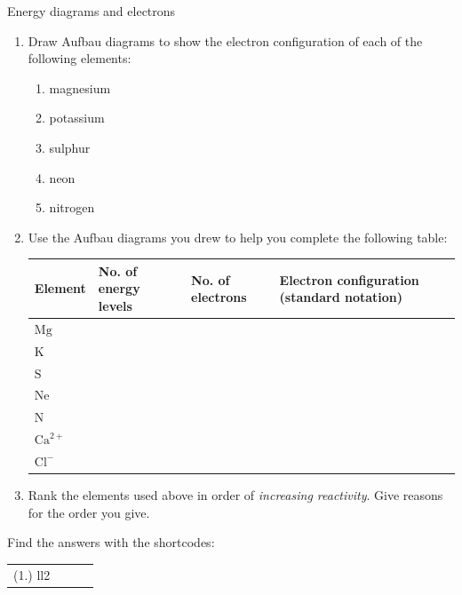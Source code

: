 \begin{exercises}{Energy diagrams and electrons}
            \nopagebreak \noindent
        \label{m38741*id260063}\begin{enumerate}[noitemsep, label=\textbf{\arabic*}. ] 
            \label{m38741*uid106}\item Draw Aufbau diagrams to show the electron configuration of each of the following elements:
\label{m38741*id260079}\begin{enumerate}[noitemsep, label=\textbf{\alph*}. ] 
            \label{m38741*uid107}\item magnesium
\label{m38741*uid108}\item potassium
\label{m38741*uid109}\item sulphur
\label{m38741*uid110}\item neon
\label{m38741*uid111}\item nitrogen
\end{enumerate}
        \label{m38741*uid112}\item Use the Aufbau diagrams you drew to help you complete the following table:
       \begin{center}
\begin{tabular}{|p{1.6cm}|p{2.6cm}|p{2.6cm}|p{2.6cm}|}\hline
\textbf{Element} & \textbf{No. of energy levels} & \textbf{No. of electrons}  & \textbf{Electron configuration (standard notation)}\\\hline
$\text{Mg}$ & &  & \\\hline
$\text{K}$ & &  & \\\hline
$\text{S}$ & & & \\\hline
$\text{Ne}$ &  & & \\\hline
$\text{N}$ & & & \\\hline
$\text{Ca}^{2+}$ & & & \\\hline
$\text{Cl}^{-}$ & & & \\\hline
\end{tabular}
\end{center}    

  \label{m38741*uid113}\item Rank the elements used above in order of \textsl{increasing reactivity}. Give reasons for the order you give.
 \end{enumerate}
 Find the answers with the shortcodes:
 \par \begin{tabular}[h]{cccc}
 (1.) ll2 & & & \end{tabular}
\end{exercises}            
